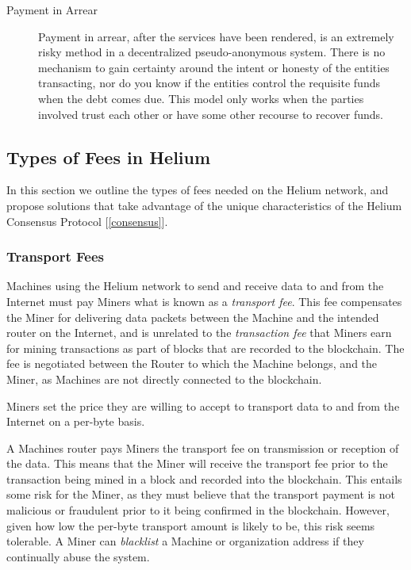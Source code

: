 \documentclass[10pt, nonatbib, nocopyrightspace, reprint]{sigplanconf}
\newcommand{\secref}[1]{[\autoref{#1}]}
\begin{document}
\begin{description}
\item [Payment in Arrear] Payment in arrear, after the services have been rendered, is an extremely risky method in a decentralized pseudo-anonymous system. There is no mechanism to gain certainty around the intent or honesty of the entities transacting, nor do you know if the entities control the requisite funds when the debt comes due. This model only works when the parties involved trust each other or have some other recourse to recover funds.

\end{description}


\subsection{Types of Fees in Helium}

In this section we outline the types of fees needed on the Helium network, and propose solutions that take advantage of the unique characteristics of the Helium Consensus Protocol \secref{consensus}.

\subsubsection{Transport Fees}

Machines using the Helium network to send and receive data to and from the Internet must pay Miners what is known as a \emph{transport fee}. This fee compensates the Miner for delivering data packets between the Machine and the intended router on the Internet, and is unrelated to the \emph{transaction fee} that Miners earn for mining transactions as part of blocks that are recorded to the blockchain. The fee is negotiated between the Router to which the Machine belongs, and the Miner, as Machines are not directly connected to the blockchain.

Miners set the price they are willing to accept to transport data to and from the Internet on a per-byte basis.

A Machines router pays Miners the transport fee on transmission or reception of the data. This means that the Miner will receive the transport fee prior to the transaction being mined in a block and recorded into the blockchain. This entails some risk for the Miner, as they must believe that the transport payment is not malicious or fraudulent prior to it being confirmed in the blockchain. However, given how low the per-byte transport amount is likely to be, this risk seems tolerable. A Miner can \emph{blacklist} a Machine or organization address if they continually abuse the system.
\end{document}
